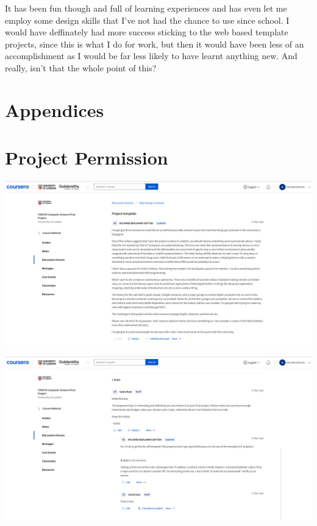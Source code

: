 \documentclass[11pt,a4paper,titlepage]{report}
\begin{document}
	It has been fun though and full of learning experiences and has even let me employ some design skills that I've not had the chance to use since school. I would have deffinately had more success sticking to the web based template projects, since this is what I do for work, but then it would have been less of an accomplishment as I would be far less likely to have learnt anything new. And really, isn't that the whole point of this?
	
	\chapter*{Appendices}
	\appendix 
	\chapter{Project Permission}\label{appendix:project_permission}
	\begin{center}
		\label{picture:permission_1}
		\includegraphics[scale=0.15]{assets/FinalProject_permission_1.png}
	\end{center}
	\begin{center}
		\label{picture:permission_2}
		\includegraphics[scale=0.15]{assets/FinalProject_permission_2.png}
	\end{center}
	
\end{document}
